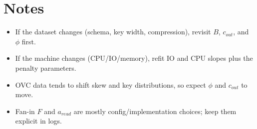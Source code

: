 \documentclass[11pt]{article}
\begin{document}
\section*{Notes}
\begin{itemize}
  \item If the dataset changes (schema, key width, compression), revisit $B$, $c_{out}$, and $\phi$ first.
  \item If the machine changes (CPU/IO/memory), refit IO and CPU slopes plus the penalty parameters.
  \item OVC data tends to shift skew and key distributions, so expect $\phi$ and $c_{out}$ to move.
  \item Fan-in $F$ and $a_{read}$ are mostly config/implementation choices; keep them explicit in logs.
\end{itemize}
\end{document}
